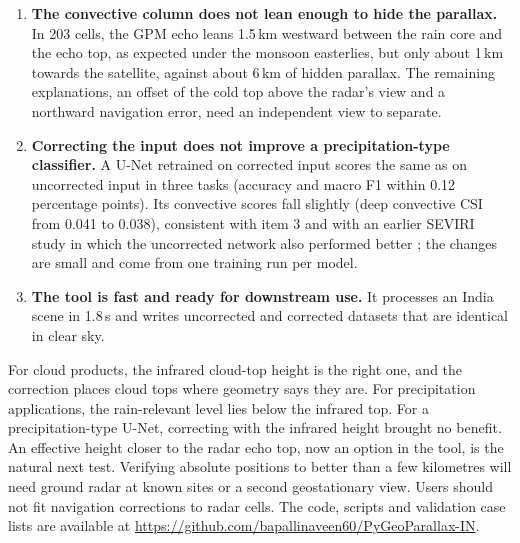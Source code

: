 \begin{enumerate}
\begin{itemize}
    \item Brightness-temperature heights of the coldest tops lie at the tropopause, about 3\,km above the GPM echo tops, with either the standard atmosphere or ERA5.
    \item In the 14 cases of 2022--2024, ERA5 profiles change the offsets by less than 0.5\,km and terrain by less than 0.1\,km; terrain moves clear-sky ground in the Himalaya by up to 6\,km.
  \end{itemize}
  \item \textbf{The convective column does not lean enough to hide the parallax.} In 203 cells, the GPM echo leans 1.5\,km westward between the rain core and the echo top, as expected under the monsoon easterlies, but only about 1\,km towards the satellite, against about 6\,km of hidden parallax. The remaining explanations, an offset of the cold top above the radar's view and a northward navigation error, need an independent view to separate.
  \item \textbf{Correcting the input does not improve a precipitation-type classifier.} A U-Net retrained on corrected input scores the same as on uncorrected input in three tasks (accuracy and macro F1 within 0.12 percentage points). Its convective scores fall slightly (deep convective CSI from 0.041 to 0.038), consistent with item 3 and with an earlier SEVIRI study in which the uncorrected network also performed better \citep{dadderio2023}; the changes are small and come from one training run per model.
  \item \textbf{The tool is fast and ready for downstream use.} It processes an India scene in 1.8\,s and writes uncorrected and corrected datasets that are identical in clear sky.
\end{enumerate}

For cloud products, the infrared cloud-top height is the right one, and the correction places cloud tops where geometry says they are. For precipitation applications, the rain-relevant level lies below the infrared top. For a precipitation-type U-Net, correcting with the infrared height brought no benefit. An effective height closer to the radar echo top, now an option in the tool, is the natural next test. Verifying absolute positions to better than a few kilometres will need ground radar at known sites or a second geostationary view. Users should not fit navigation corrections to radar cells. The code, scripts and validation case lists are available at \url{https://github.com/bapallinaveen60/PyGeoParallax-IN}.
